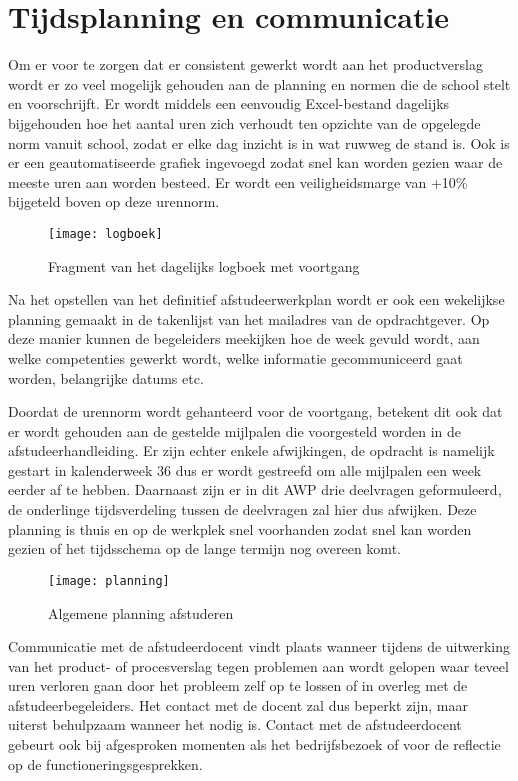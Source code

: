 \chapter{Tijdsplanning en communicatie}
Om er voor te zorgen dat er consistent gewerkt wordt aan het productverslag wordt er zo veel mogelijk gehouden aan de planning en normen die de school stelt en voorschrijft. Er wordt middels een eenvoudig Excel-bestand dagelijks bijgehouden hoe het aantal uren zich verhoudt ten opzichte van de opgelegde norm vanuit school, zodat er elke dag inzicht is in wat ruwweg de stand is. Ook is er een geautomatiseerde grafiek ingevoegd zodat snel kan worden gezien waar de meeste uren aan worden besteed. Er wordt een veiligheidsmarge van +10\% bijgeteld boven op deze urennorm. 

\begin{figure}[h]
    \centering
    \texttt{[image: logboek]}
    \label{fig:logboek}
    \caption{Fragment van het dagelijks logboek met voortgang}
\end{figure}

Na het opstellen van het definitief afstudeerwerkplan wordt er ook een wekelijkse planning gemaakt in de takenlijst van het mailadres van de opdrachtgever. Op deze manier kunnen de begeleiders meekijken hoe de week gevuld wordt, aan welke competenties gewerkt wordt, welke informatie gecommuniceerd gaat worden, belangrijke datums etc.

\newpage
Doordat de urennorm wordt gehanteerd voor de voortgang, betekent dit ook dat er wordt gehouden aan de gestelde mijlpalen die voorgesteld worden in de afstudeerhandleiding. Er zijn echter enkele afwijkingen, de opdracht is namelijk gestart in kalenderweek 36 dus er wordt gestreefd om alle mijlpalen een week eerder af te hebben. Daarnaast zijn er in dit AWP drie deelvragen geformuleerd, de onderlinge tijdsverdeling tussen de deelvragen zal hier dus afwijken. Deze planning is thuis en op de werkplek snel voorhanden zodat snel kan worden gezien of het tijdsschema op de lange termijn nog overeen komt.

\begin{figure}[!ht]
    \centering
    \texttt{[image: planning]}
    \label{fig:planning}
    \caption{Algemene planning afstuderen}
\end{figure}

Communicatie met de afstudeerdocent vindt plaats wanneer tijdens de uitwerking van het product- of procesverslag tegen problemen aan wordt gelopen waar teveel uren verloren gaan door het probleem zelf op te lossen of in overleg met de afstudeerbegeleiders. Het contact met de docent zal dus beperkt zijn, maar uiterst behulpzaam wanneer het nodig is. Contact met de afstudeerdocent gebeurt ook bij afgesproken momenten als het bedrijfsbezoek of voor de reflectie op de functioneringsgesprekken.

